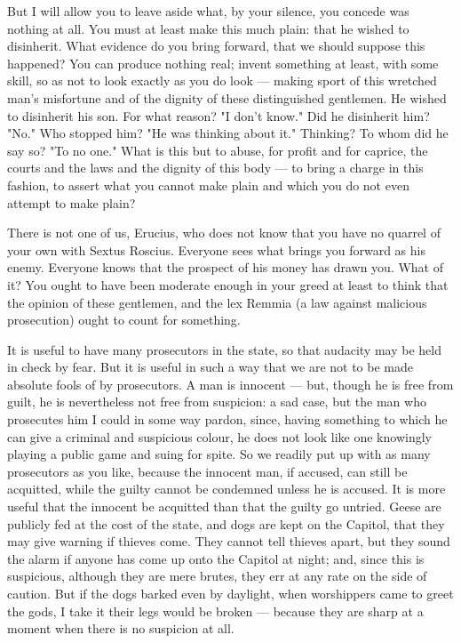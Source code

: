  But I will allow you to leave aside what, by your silence, you concede was nothing at all. You must at least make this much plain: that he wished to disinherit. What evidence do you bring forward, that we should suppose this happened? You can produce nothing real; invent something at least, with some skill, so as not to look exactly as you do look --- making sport of this wretched man's misfortune and of the dignity of these distinguished gentlemen. He wished to disinherit his son. For what reason? "I don't know." Did he disinherit him? "No." Who stopped him? "He was thinking about it." Thinking? To whom did he say so? "To no one." What is this but to abuse, for profit and for caprice, the courts and the laws and the dignity of this body --- to bring a charge in this fashion, to assert what you cannot make plain and which you do not even attempt to make plain?

 There is not one of us, Erucius, who does not know that you have no quarrel of your own with Sextus Roscius. Everyone sees what brings you forward as his enemy. Everyone knows that the prospect of his money has drawn you. What of it? You ought to have been moderate enough in your greed at least to think that the opinion of these gentlemen, and the lex Remmia (a law against malicious prosecution) ought to count for something.

 It is useful to have many prosecutors in the state, so that audacity may be held in check by fear. But it is useful in such a way that we are not to be made absolute fools of by prosecutors. A man is innocent --- but, though he is free from guilt, he is nevertheless not free from suspicion: a sad case, but the man who prosecutes him I could in some way pardon, since, having something to which he can give a criminal and suspicious colour, he does not look like one knowingly playing a public game and suing for spite. So we readily put up with as many prosecutors as you like, because the innocent man, if accused, can still be acquitted, while the guilty cannot be condemned unless he is accused. It is more useful that the innocent be acquitted than that the guilty go untried. Geese are publicly fed at the cost of the state, and dogs are kept on the Capitol, that they may give warning if thieves come. They cannot tell thieves apart, but they sound the alarm if anyone has come up onto the Capitol at night; and, since this is suspicious, although they are mere brutes, they err at any rate on the side of caution. But if the dogs barked even by daylight, when worshippers came to greet the gods, I take it their legs would be broken --- because they are sharp at a moment when there is no suspicion at all.

